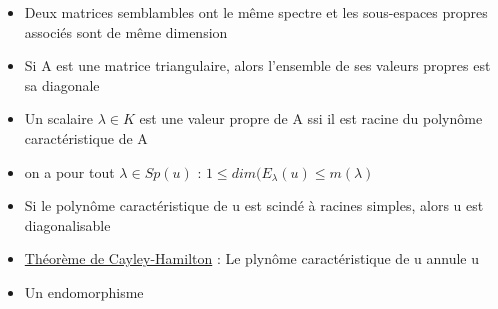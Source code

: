 \documentclass{book}
\begin{document}
\begin{itemize}[label=$\ast$]
	\item Deux matrices semblambles ont le même spectre et les sous-espaces propres associés sont de même dimension
	\item Si A est une matrice triangulaire, alors l'ensemble de ses valeurs propres est sa diagonale
	\item Un scalaire \( \lambda \in K \) est une valeur propre de A ssi il est racine du polynôme caractéristique de A
	\item on a pour tout \( \lambda \in Sp(u) \) : \( 1 \leq dim(E_{\lambda}(u) \leq m(\lambda) \)
	\item Si le polynôme caractéristique de u est scindé à racines simples, alors u est diagonalisable
	\item \underline{Théorème de Cayley-Hamilton} : Le plynôme caractéristique de u annule u
	\item Un endomorphisme 

\end{itemize}
\end{document}
